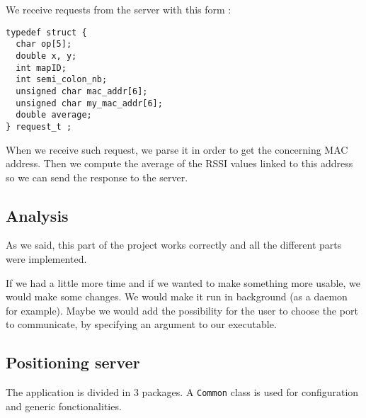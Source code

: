 We receive requests from the server with this form :

\begin{lstlisting}
typedef struct {
  char op[5];
  double x, y;
  int mapID;
  int semi_colon_nb;
  unsigned char mac_addr[6];
  unsigned char my_mac_addr[6];
  double average;
} request_t ;
\end{lstlisting}

When we receive such request, we parse it in order to get the concerning MAC
address. Then we compute the average of the RSSI values linked to this address
so we can send the response to the server.

\subsection{Analysis}

As we said, this part of the project works correctly and all the different
parts were implemented. 

If we had a little more time and if we wanted to make something more usable, we
would make some changes. We would make it run in background (as a daemon for
example). Maybe we would add the possibility for the user to choose the port to
communicate, by specifying an argument to our executable.

\newpage

\subsection{Positioning server}


The application is divided in 3 packages. A \verb+Common+ class is used for configuration and generic fonctionalities.
